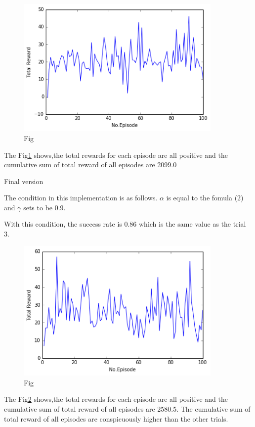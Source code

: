 \documentclass[a4paper,11pt]{article}
\begin{document}
\begin{figure}[H]
\begin{center}
\includegraphics[width=100mm]{graph/better.jpg}
\end{center}
\caption{Fig}
\label{fig:three}
\end{figure}

The Fig\ref{fig:three} shows,the total rewards for each episode are all positive and the cumulative sum of total reward of all episodes are 2099.0


Final version

The condition in this implementation is as follows.
$\alpha$ is equal to the fomula (2) and $\gamma$ sets to be 0.9.

With this condition, the success rate is 0.86 which is the same value as the trial 3.

\begin{figure}[H]
\begin{center}
\includegraphics[width=100mm]{graph/gamma_con.jpg}
\end{center}
\caption{Fig}
\label{fig:four}
\end{figure}

The Fig\ref{fig:four} shows,the total rewards for each episode are all positive and the cumulative sum of total reward of all episodes are 2580.5.
The cumulative sum of total reward of all episodes are conspicuously higher than the other trials. 
\end{document}
